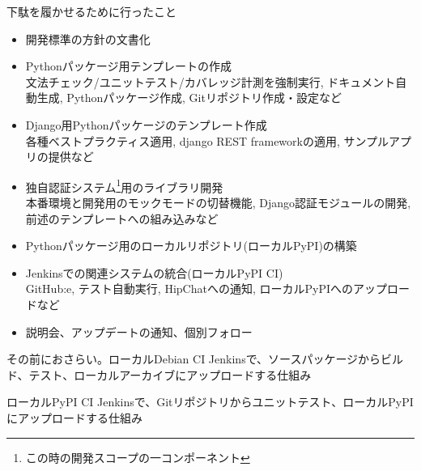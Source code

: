 \begin{frame}{下駄を履かせるために行ったこと}

  {\footnotesize
  \begin{itemize}
  \item 開発標準の方針の文書化
  \item Pythonパッケージ用テンプレートの作成 \\
    {\tiny
      文法チェック/ユニットテスト/カバレッジ計測を強制実行, ドキュメント自動生成, Pythonパッケージ作成, Gitリポジトリ作成・設定など}
  \item Django用Pythonパッケージのテンプレート作成 \\
    {\tiny 各種ベストプラクティス適用, django REST frameworkの適用, サンプルアプリの提供など}
  \item 独自認証システム\footnote{この時の開発スコープの一コンポーネント}用のライブラリ開発 \\
    {\tiny 本番環境と開発用のモックモードの切替機能, Django認証モジュールの開発, 前述のテンプレートへの組み込みなど}
  \item Pythonパッケージ用のローカルリポジトリ(ローカルPyPI)の構築
  \item Jenkinsでの関連システムの統合(ローカルPyPI CI) \\
    {\tiny GitHub:e, テスト自動実行, HipChatへの通知, ローカルPyPIへのアップロードなど}
  \item 説明会、アップデートの通知、個別フォロー
  \end{itemize}
  }
\end{frame}

\begin{frame}{その前におさらい。ローカルDebian CI}
  Jenkinsで、ソースパッケージからビルド、テスト、ローカルアーカイブにアップロードする仕組み
\end{frame}

\begin{frame}{ローカルPyPI CI}
  Jenkinsで、Gitリポジトリからユニットテスト、ローカルPyPIにアップロードする仕組み
\end{frame}

